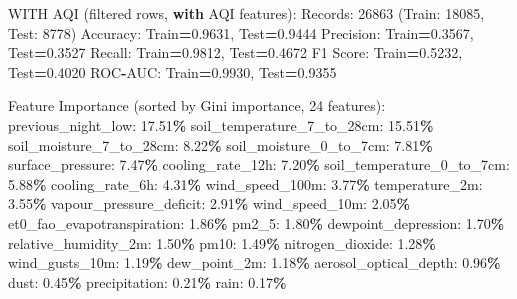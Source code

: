 \documentclass[
  letterpaper,
  DIV=11,
  numbers=noendperiod]{scrartcl}
\newenvironment{Shaded}{\begin{snugshade}}{\end{snugshade}}
\newcommand{\BuiltInTok}[1]{#1}
\newcommand{\ControlFlowTok}[1]{\textcolor[rgb]{0.13,0.29,0.53}{\textbf{#1}}}
\newcommand{\DecValTok}[1]{\textcolor[rgb]{0.00,0.00,0.81}{#1}}
\newcommand{\FloatTok}[1]{\textcolor[rgb]{0.00,0.00,0.81}{#1}}
\newcommand{\NormalTok}[1]{#1}
\newcommand{\OperatorTok}[1]{\textcolor[rgb]{0.81,0.36,0.00}{\textbf{#1}}}
\begin{document}
\begin{Shaded}
\begin{Highlighting}[]
\NormalTok{WITH AQI (filtered rows, }\ControlFlowTok{with}\NormalTok{ AQI features):}
\NormalTok{  Records: }\DecValTok{26863}\NormalTok{ (Train: }\DecValTok{18085}\NormalTok{, Test: }\DecValTok{8778}\NormalTok{)}
\NormalTok{  Accuracy: Train}\OperatorTok{=}\FloatTok{0.9631}\NormalTok{, Test}\OperatorTok{=}\FloatTok{0.9444}
\NormalTok{  Precision: Train}\OperatorTok{=}\FloatTok{0.3567}\NormalTok{, Test}\OperatorTok{=}\FloatTok{0.3527}
\NormalTok{  Recall: Train}\OperatorTok{=}\FloatTok{0.9812}\NormalTok{, Test}\OperatorTok{=}\FloatTok{0.4672}
\NormalTok{  F1 Score: Train}\OperatorTok{=}\FloatTok{0.5232}\NormalTok{, Test}\OperatorTok{=}\FloatTok{0.4020}
\NormalTok{  ROC}\OperatorTok{{-}}\NormalTok{AUC: Train}\OperatorTok{=}\FloatTok{0.9930}\NormalTok{, Test}\OperatorTok{=}\FloatTok{0.9355}

\NormalTok{  Feature Importance (}\BuiltInTok{sorted}\NormalTok{ by Gini importance, }\DecValTok{24}\NormalTok{ features):}
\NormalTok{    previous\_night\_low: }\FloatTok{17.51}\OperatorTok{\%}
\NormalTok{    soil\_temperature\_7\_to\_28cm: }\FloatTok{15.51}\OperatorTok{\%}
\NormalTok{    soil\_moisture\_7\_to\_28cm: }\FloatTok{8.22}\OperatorTok{\%}
\NormalTok{    soil\_moisture\_0\_to\_7cm: }\FloatTok{7.81}\OperatorTok{\%}
\NormalTok{    surface\_pressure: }\FloatTok{7.47}\OperatorTok{\%}
\NormalTok{    cooling\_rate\_12h: }\FloatTok{7.20}\OperatorTok{\%}
\NormalTok{    soil\_temperature\_0\_to\_7cm: }\FloatTok{5.88}\OperatorTok{\%}
\NormalTok{    cooling\_rate\_6h: }\FloatTok{4.31}\OperatorTok{\%}
\NormalTok{    wind\_speed\_100m: }\FloatTok{3.77}\OperatorTok{\%}
\NormalTok{    temperature\_2m: }\FloatTok{3.55}\OperatorTok{\%}
\NormalTok{    vapour\_pressure\_deficit: }\FloatTok{2.91}\OperatorTok{\%}
\NormalTok{    wind\_speed\_10m: }\FloatTok{2.05}\OperatorTok{\%}
\NormalTok{    et0\_fao\_evapotranspiration: }\FloatTok{1.86}\OperatorTok{\%}
\NormalTok{    pm2\_5: }\FloatTok{1.80}\OperatorTok{\%}
\NormalTok{    dewpoint\_depression: }\FloatTok{1.70}\OperatorTok{\%}
\NormalTok{    relative\_humidity\_2m: }\FloatTok{1.50}\OperatorTok{\%}
\NormalTok{    pm10: }\FloatTok{1.49}\OperatorTok{\%}
\NormalTok{    nitrogen\_dioxide: }\FloatTok{1.28}\OperatorTok{\%}
\NormalTok{    wind\_gusts\_10m: }\FloatTok{1.19}\OperatorTok{\%}
\NormalTok{    dew\_point\_2m: }\FloatTok{1.18}\OperatorTok{\%}
\NormalTok{    aerosol\_optical\_depth: }\FloatTok{0.96}\OperatorTok{\%}
\NormalTok{    dust: }\FloatTok{0.45}\OperatorTok{\%}
\NormalTok{    precipitation: }\FloatTok{0.21}\OperatorTok{\%}
\NormalTok{    rain: }\FloatTok{0.17}\OperatorTok{\%}


\end{Highlighting}
\end{Shaded}
\end{document}
